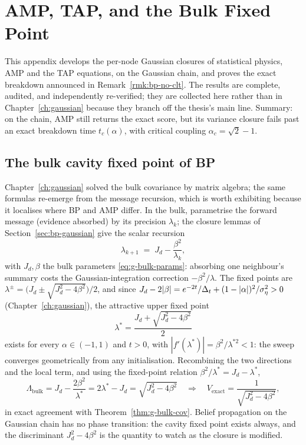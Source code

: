 \chapter{AMP, TAP, and the Bulk Fixed Point}\label{app:amp}

This appendix develops the per-node Gaussian closures of statistical
physics, AMP and the TAP equations, on the Gaussian chain, and proves the
exact breakdown announced in Remark~\ref{rmk:bp-no-clt}. The results are
complete, audited, and independently re-verified; they are collected here
rather than in Chapter~\ref{ch:gaussian} because they branch off the
thesis's main line. Summary: on the chain, AMP still returns the exact
score, but its variance closure fails past an exact breakdown time
$t_c(\alpha)$, with critical coupling $\alpha_c = \sqrt{2} - 1$.

\section{The bulk cavity fixed point of BP}\label{sec:amp-bulk-bp}

Chapter~\ref{ch:gaussian} solved the bulk covariance by matrix algebra;
the same formulas re-emerge from the message recursion, which is worth
exhibiting because it localises where BP and AMP differ. In the bulk,
parametrise the forward message (evidence absorbed) by its precision
$\lambda_k$; the closure lemmas of Section~\ref{sec:bp-gaussian} give the
scalar recursion
\begin{equation}
  \lambda_{k+1} \;=\; J_d - \frac{\beta^2}{\lambda_k},
  \label{eq:bp-cavity}
\end{equation}
with $J_d, \beta$ the bulk parameters \eqref{eq:g-bulk-params}: absorbing
one neighbour's summary costs the Gaussian-integration correction
$-\beta^2/\lambda$. The fixed points are
$\lambda^\pm = \big( J_d \pm \sqrt{J_d^2 - 4\beta^2} \big)/2$, and since
$J_d - 2|\beta| = e^{-2t}/\Delta_t + (1 - |\alpha|)^2/\sigma_\eta^2 > 0$
(Chapter~\ref{ch:gaussian}), the attractive upper fixed point
\begin{equation}
  \boxed{\;\lambda^\ast = \frac{J_d + \sqrt{J_d^2 - 4\beta^2}}{2}\;}
  \label{eq:bp-lambdastar}
\end{equation}
exists for every $\alpha \in (-1,1)$ and $t > 0$, with
$|f'(\lambda^\ast)| = \beta^2/\lambda^{\ast 2} < 1$: the sweep converges
geometrically from any initialisation. Recombining the two directions and
the local term, and using the fixed-point relation
$\beta^2/\lambda^\ast = J_d - \lambda^\ast$,
\begin{equation}
  \Lambda_{\mathrm{bulk}}
  = J_d - \frac{2\beta^2}{\lambda^\ast}
  = 2\lambda^\ast - J_d
  = \sqrt{J_d^2 - 4\beta^2}
  \quad\Longrightarrow\quad
  V_{\mathrm{exact}} = \frac{1}{\sqrt{J_d^2 - 4\beta^2}} ,
  \label{eq:bp-bulkvar}
\end{equation}
in exact agreement with Theorem~\ref{thm:g-bulk-cov}. Belief propagation
on the Gaussian chain has no phase transition: the cavity fixed point
exists always, and the discriminant $J_d^2 - 4\beta^2$ is the quantity to
watch as the closure is modified.

